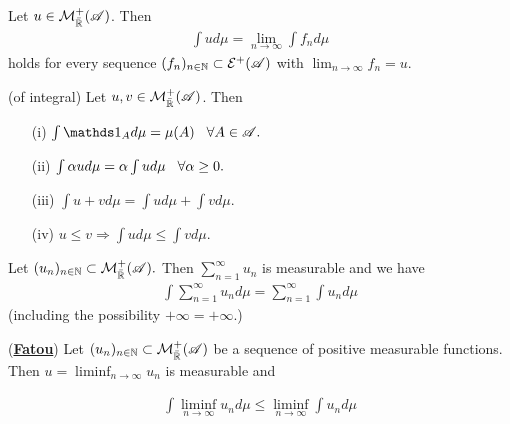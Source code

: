 \begin{corollary}
    Let $u\in \mathcal{M}_{\bar{\mathbb{R}}}^+(\mathscr{A})$. Then \begin{align*}
        \int ud\mu = \lim_{n\rightarrow \infty} \int f_n d\mu
    \end{align*}
    holds for every sequence $(f_n)_{n\in\mathbb{N}}\subset \mathcal{E}^+(\mathscr{A})$ with $\lim_{n\rightarrow\infty} f_n=u.$

\end{corollary}


\begin{proposition} (of integral)
    Let $u,v\in\mathcal{M}_{\bar{\mathbb{R}}}^+(\mathscr{A})$. Then
    \begin{enumerate}
        \item[(i)] $\int \one_A d\mu = \mu(A)\hspace{3mm}\forall A\in\A.$
        \item[(ii)] $\int \alpha ud\mu = \alpha\int u d\mu \hspace{3mm} \forall \alpha\geq 0.$
        \item[(iii)] $\int u+v d\mu = \int u d\mu +\int v d\mu.$
        \item[(iv)]  $u\leq v\Rightarrow \int u d\mu\leq \int v d\mu.$
    \end{enumerate}
\end{proposition}

\begin{corollary}
    Let $(u_n)_{n\in\mathbb{N}}\subset \mathcal{M}_{\bar{\mathbb{R}}}^+(\mathscr{A}).$ Then $\sum_{n=1}^\infty u_n$ is measurable and we have
    \begin{align*}
        \int \sum_{n=1}^\infty u_n d\mu = \sum_{n=1}^\infty \int u_nd\mu
    \end{align*}
    (including the possibility $+\infty = +\infty.$)
\end{corollary}

\begin{theorem}(\underline{\textbf{Fatou}})
    Let $(u_n)_{n\in\mathbb{N}}\subset \mathcal{M}_{\bar{\mathbb{R}}}^+(\mathscr{A})$ be a sequence of positive measurable functions. Then 
$u=\liminf_{n\rightarrow\infty} u_n$ is measurable and 

\begin{align}
    \int\liminf_{n\rightarrow\infty}u_n d\mu \leq\liminf_{n\rightarrow\infty}\int u_n d\mu 
\end{align}
\end{theorem} 